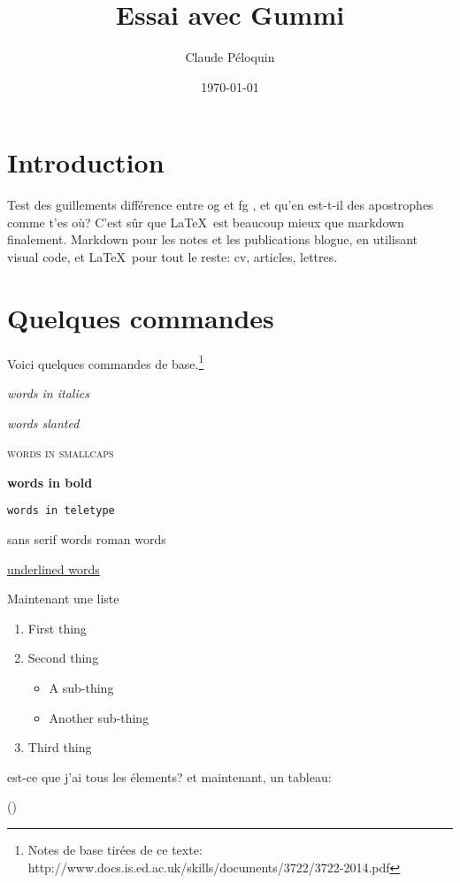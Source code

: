 \documentclass[12pt]{article}
\title{\textbf{Essai avec Gummi}}
\author{Claude Péloquin}
\date{\today}
\begin{document}
\maketitle
\thispagestyle{empty}


\section*{Introduction}

Test des guillements différence entre \og og et fg \fg, et qu'en est-t-il des apostrophes comme t'es où? C'est sûr que \LaTeX\ est beaucoup mieux que markdown finalement. Markdown pour les notes et les publications blogue, en utilisant visual code, et \LaTeX\ pour tout le reste: cv, articles, lettres.

\section*{Quelques commandes}

Voici quelques commandes de base.\footnote{Notes de base tirées de ce texte: http://www.docs.is.ed.ac.uk/skills/documents/3722/3722-2014.pdf}

\textit{words in italics}

\textsl{words slanted}

\textsc{words in smallcaps}

\textbf{words in bold}

\texttt{words in teletype}

\textsf{sans serif words
}
\textrm{roman words}

\underline{underlined words}

Maintenant une liste
\begin{enumerate}\item First thing\item Second thing\begin{itemize}\item A sub-thing\item Another sub-thing\end{itemize}\item Third thing\end{enumerate}
est-ce que j'ai tous les élements?
et maintenant, un tableau: 

(\cite{Reynaud1990})
\end{document}
